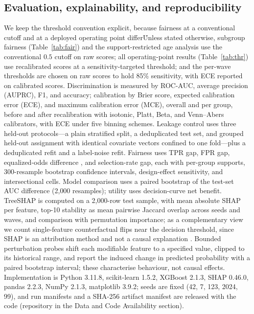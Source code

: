\documentclass[conference]{IEEEtran}
\begin{document}
\subsection{Evaluation, explainability, and reproducibility}
We keep the threshold convention explicit, because fairness at a conventional cutoff and at a deployed operating point differ\. Unless stated otherwise, subgroup fairness (Table~\ref{tab:fair}) and the support-restricted age analysis use the conventional $0.5$ cutoff on raw scores; all operating-point results (Table~\ref{tab:thr}) use recalibrated scores at a sensitivity-targeted threshold; and the per-wave thresholds are chosen on raw scores to hold 85\% sensitivity, with ECE reported on calibrated scores. Discrimination is measured by ROC-AUC, average precision (AUPRC), F1, and accuracy; calibration by Brier score, expected calibration error (ECE), and maximum calibration error (MCE), overall and per group, before and after recalibration with isotonic, Platt, Beta, and Venn--Abers calibrators, with ECE under five binning schemes. Leakage control uses three held-out protocols---a plain stratified split, a deduplicated test set, and grouped held-out assignment with identical covariate vectors confined to one fold---plus a deduplicated refit and a label-noise refit. Fairness uses TPR gap, FPR gap, equalized-odds difference \cite{hardt2016}, and selection-rate gap, each with per-group supports, 300-resample bootstrap confidence intervals, design-effect sensitivity, and intersectional cells. Model comparison uses a paired bootstrap of the test-set AUC difference (2{,}000 resamples); utility uses decision-curve net benefit. TreeSHAP \cite{shap2017} is computed on a 2{,}000-row test sample, with mean absolute SHAP per feature, top-10 stability as mean pairwise Jaccard overlap across seeds and waves, and comparison with permutation importance; as a complementary view we count single-feature counterfactual flips near the decision threshold, since SHAP is an attribution method and not a causal explanation \cite{shaplimits}. Bounded perturbation probes shift each modifiable feature to a specified value, clipped to its historical range, and report the induced change in predicted probability with a paired bootstrap interval; these characterise behaviour, not causal effects. Implementation is Python 3.11.8, scikit-learn 1.5.2, XGBoost 2.1.3, SHAP 0.46.0, pandas 2.2.3, NumPy 2.1.3, matplotlib 3.9.2; seeds are fixed (42, 7, 123, 2024, 99), and run manifests and a SHA-256 artifact manifest are released with the code (repository in the Data and Code Availability section).
\end{document}
